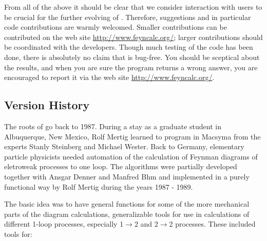
From all of the above it should be clear that we consider interaction with users to be crucial
for the further evolving of \fc. Therefore, suggestions and in particular
code contributions are warmly welcomed. Smaller contributions can be contributed
on the web site \href{http://www.feyncalc.org/}{http://www.feyncalc.org/}; 
larger contributions should be coordinated with the developers.
Though much testing of the code has been done, there is absolutely no claim that
\fc is bug-free. You should be sceptical about the results, and when you are sure the
program  returns a wrong answer, you are encouraged to report it via the web site
\href{http://www.feyncalc.org/}{http://www.feyncalc.org/}.

\subsection*{Version History}

The roots of \fc go back to 1987. 
During a stay as a graduate student in Albuquerque, New Mexico, Rolf Mertig learned to program in Macsyma \cite{Drinkard:1981dr} from the experts Stanly Steinberg and Michael Wester. Back to Germany, 
elementary particle physicists needed automation of the calculation of Feynman diagrams of eletroweak 
processes to one loop. The algorithms were partially developed together with 
Ansgar Denner and Manfred B\ODoubleDot{}hm and implemented in a 
purely functional way by Rolf Mertig during the years 1987 - 1989. 

The basic idea was to have general functions for some of the more mechanical parts of the diagram calculations, generalizable tools for use in calculations of different 1-loop processes, especially 1\(\rightarrow \)2 and 2\(\rightarrow \)2 processes. These included tools for:

